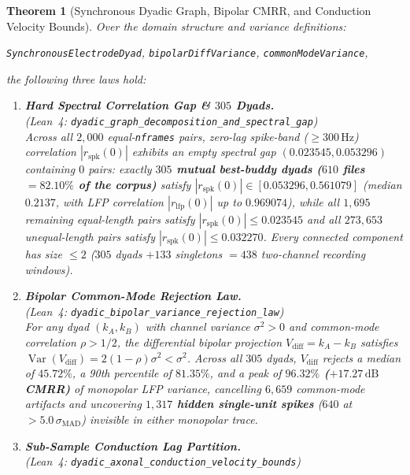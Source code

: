 \documentclass[11pt,letterpaper]{article}
\newcommand{\lean}[1]{\nolinkurl{#1}}
\newtheorem{theorem}{Theorem}[section]
\theoremstyle{definition}
\begin{document}
\begin{theorem}[Synchronous Dyadic Graph, Bipolar CMRR, and Conduction Velocity Bounds]\label{thm:pillar3}
Over the domain structure and variance definitions:
\begin{center}
\footnotesize
\lean{SynchronousElectrodeDyad}, \quad \lean{bipolarDiffVariance}, \quad \lean{commonModeVariance},
\end{center}
the following three laws hold:
\begin{enumerate}
  \item \textbf{Hard Spectral Correlation Gap \& $305$ Dyads.}\\
  (\emph{Lean~4:} \lean{dyadic_graph_decomposition_and_spectral_gap})\\
  Across all $2{,}000$ equal-\texttt{nframes} pairs, zero-lag spike-band ($\ge 300\,\text{Hz}$) correlation $|r_{\mathrm{spk}}(0)|$ exhibits an empty spectral gap $(0.023545, 0.053296)$ containing $0$ pairs: exactly \textbf{$305$ mutual best-buddy dyads ($610$ files $= 82.10\%$ of the corpus)} satisfy $|r_{\mathrm{spk}}(0)| \in [0.053296, 0.561079]$ (median $0.2137$, with LFP correlation $|r_{\mathrm{lfp}}(0)|$ up to $0.969074$), while all $1{,}695$ remaining equal-length pairs satisfy $|r_{\mathrm{spk}}(0)| \le 0.023545$ and all $273{,}653$ unequal-length pairs satisfy $|r_{\mathrm{spk}}(0)| \le 0.032270$. Every connected component has size $\le 2$ ($305$ dyads $+ 133$ singletons $= 438$ two-channel recording windows).
  \item \textbf{Bipolar Common-Mode Rejection Law.}\\
  (\emph{Lean~4:} \lean{dyadic_bipolar_variance_rejection_law})\\
  For any dyad $(k_A, k_B)$ with channel variance $\sigma^2 > 0$ and common-mode correlation $\rho > 1/2$, the differential bipolar projection $V_{\mathrm{diff}} = k_A - k_B$ satisfies $\operatorname{Var}(V_{\mathrm{diff}}) = 2(1 - \rho)\sigma^2 < \sigma^2$. Across all $305$ dyads, $V_{\mathrm{diff}}$ rejects a median of \textbf{$45.72\%$}, a 90th percentile of \textbf{$81.35\%$}, and a peak of \textbf{$96.32\%$ ($+17.27\,\text{dB}$ CMRR)} of monopolar LFP variance, cancelling $6{,}659$ common-mode artifacts and uncovering \textbf{$1{,}317$ hidden single-unit spikes} ($640$ at $> 5.0\,\sigma_{\mathrm{MAD}}$) invisible in either monopolar trace.
  \item \textbf{Sub-Sample Conduction Lag Partition.}\\
  (\emph{Lean~4:} \lean{dyadic_axonal_conduction_velocity_bounds})\\

\end{enumerate}
\end{theorem}
\end{document}
